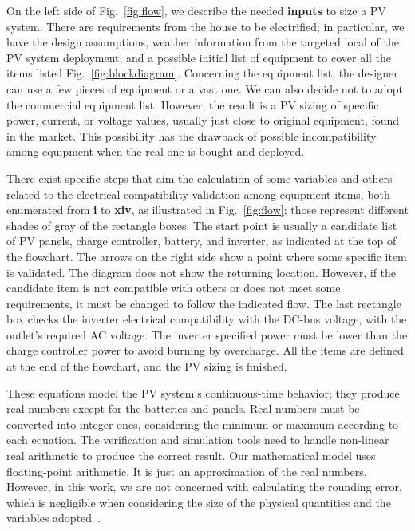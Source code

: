 \documentclass[journal]{IEEEtran}
\begin{document}
On the left side of Fig.~\ref{fig:flow}, we describe the needed \textbf{inputs} to size a PV system. There are requirements from the house to be electrified; in particular, we have the design assumptions, weather information from the targeted local of the PV system deployment, and a possible initial list of equipment to cover all the items listed Fig.~\ref{fig:blockdiagram}. Concerning the equipment list, the designer can use a few pieces of equipment or a vast one. We can also decide not to adopt the commercial equipment list. However, the result is a PV sizing of specific power, current, or voltage values, usually just close to original equipment, found in the market. This possibility has the drawback of possible incompatibility among equipment when the real one is bought and deployed.

There exist specific steps that aim the calculation of some variables and others related to the electrical compatibility validation among equipment items, both enumerated from \textbf{i} to \textbf{xiv}, as illustrated in Fig.~\ref{fig:flow}; those represent different shades of gray of the rectangle boxes. The start point is usually a candidate list of PV panels, charge controller, battery, and inverter, as indicated at the top of the flowchart. The arrows on the right side show a point where some specific item is validated. The diagram does not show the returning location. However, if the candidate item is not compatible with others or does not meet some requirements, it must be changed to follow the indicated flow. The last rectangle box checks the inverter electrical compatibility with the DC-bus voltage, with the outlet's required AC voltage. The inverter specified power must be lower than the charge controller power to avoid burning by overcharge. All the items are defined at the end of the flowchart, and the PV sizing is finished.

These equations model the PV system's continuous-time behavior; they produce real numbers except for the batteries and panels. Real numbers must be converted into integer ones, considering the minimum or maximum according to each equation. The verification and simulation tools need to handle non-linear real arithmetic to produce the correct result. Our mathematical model uses floating-point arithmetic. It is just an approximation of the real numbers. However, in this work, we are not concerned with calculating the rounding error, which is negligible when considering the size of the physical quantities and the variables adopted~\cite{DBLP:journals/corr/abs-2004-12699}.
\end{document}
